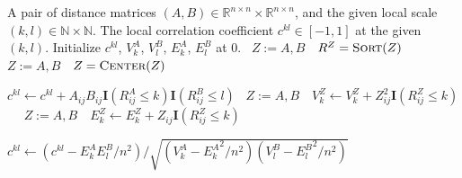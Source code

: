 \documentclass[11pt]{article}
\providecommand{\sct}[1]{{\normalfont\textsc{#1}}}
\providecommand{\mb}[1]{\boldsymbol{#1}}
\newcommand{\Real}{\mathbb{R}}
\newcommand{\GG}{c}
\newcommand{\Linefor}[2]{%
    \State \algorithmicfor\ {#1}\ \algorithmicdo\ {#2} \algorithmicend\ \algorithmicfor%
}
\newcommand{\Mgc}{\sct{Mgc}}
\newcommand{\rto}{\leftarrow}
\begin{document}
\clearpage

\begin{algorithm}
\caption{Compute local test statistic at a given scale. This algorithm runs in $O(n^2)$ once the rank information is provided, which is suitable for \Mgc~computation if an optimal scale is already estimated. But it would take $O(n^4)$ if used to compute all local correlations. Note that for the default \Mgc~implementation by single centering, the centering function centers $A$ by column and $B$ by row, and the sorting function sorts $A$ within column and $B$ within row.}
\label{alg:1scale}
\begin{algorithmic}[1]
\Require A pair of distance matrices $(A, B) \in \Real^{n \times n} \times \Real^{n \times n}$, and the given local scale $(k,l) \in \mathbb{N} \times \mathbb{N}$.
\Ensure The local correlation coefficient $\GG^{kl} \in [-1,1]$ at the given $(k,l)$.
\State Initialize $\GG^{kl}$, $V^{A}_{k}$, $V^{B}_{l}$, $E^{A}_{k}$, $E^{B}_{l}$ at $0$.
\Linefor{$Z:=A,B$}{$R^{Z}=\textsc{Sort}(Z)$} 
\Linefor{$Z:=A,B$}{$Z=\textsc{Center}(Z)$}  

\State $\GG^{kl} \rto \GG^{kl}+A_{ij}B_{ij}\mb{I}(R^{A}_{ij} \leq k)\mb{I}(R^{B}_{ij} \leq l)$ 
\Linefor{$Z:=A,B$}{$V^{Z}_{k} \rto V^{Z}_{k}+Z_{ij}^2\mb{I}(R^{Z}_{ij} \leq k)$} 
\Linefor{$Z:=A,B$}{$E^{Z}_{k} \rto E^{Z}_{k}+Z_{ij}\mb{I}(R^{Z}_{ij} \leq k)$} 
\EndFor

\State $\GG^{kl} \rto \left(\GG^{kl}-E^{A}_{k}E^{B}_{l}/n^2\right)/\sqrt{\left(V^{A}_{k}-{E^{A}_{k}}^2/n^2\right) \left(V^{B}_{l}-{E^{B}_{l}}^2/n^2\right)}$  

\EndFunction
\end{algorithmic}
\end{algorithm} 

\clearpage
\end{document}
